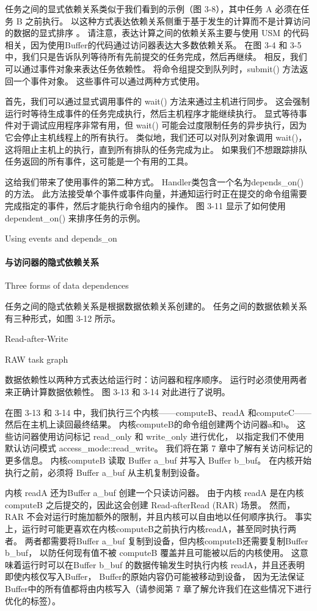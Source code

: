 任务之间的显式依赖关系类似于我们看到的示例（图 3-8），其中任务 A 必须在任务 B 之前执行。
以这种方式表达依赖关系侧重于基于发生的计算而不是计算访问的数据的显式排序 。 
请注意，表达计算之间的依赖关系主要与使用 USM 的代码相关，因为使用Buffer的代码通过访问器表达大多数依赖关系。 
在图 3-4 和 3-5 中，我们只是告诉队列等待所有先前提交的任务完成，然后再继续。 
相反，我们可以通过事件对象来表达任务依赖性。 将命令组提交到队列时，submit() 方法返回一个事件对象。 
这些事件可以通过两种方式使用。

首先，我们可以通过显式调用事件的 wait() 方法来通过主机进行同步。 
这会强制运行时等待生成事件的任务完成执行，然后主机程序才能继续执行。 
显式等待事件对于调试应用程序非常有用，但 wait() 可能会过度限制任务的异步执行，因为它会停止主机线程上的所有执行。 
类似地，我们还可以对队列对象调用 wait()，这将阻止主机上的执行，直到所有排队的任务完成为止。 
如果我们不想跟踪排队任务返回的所有事件，这可能是一个有用的工具。

这给我们带来了使用事件的第二种方式。 Handler类包含一个名为depends\_on() 的方法。 
此方法接受单个事件或事件向量，并通知运行时正在提交的命令组需要完成指定的事件，然后才能执行命令组内的操作。 
图 3-11 显示了如何使用 dependent\_on() 来排序任务的示例。

{\color{red} Using events and depends\_on}

\paragraph{与访问器的隐式依赖关系}

{\color{red} Three forms of data dependences}

任务之间的隐式依赖关系是根据数据依赖关系创建的。 任务之间的数据依赖关系有三种形式，如图 3-12 所示。

{\color{red} Read-after-Write}

{\color{red} RAW task graph}

数据依赖性以两种方式表达给运行时：访问器和程序顺序。 运行时必须使用两者来正确计算数据依赖性。 
图 3-13 和 3-14 对此进行了说明。

在图 3-13 和 3-14 中，我们执行三个内核——computeB、readA 和computeC——然后在主机上读回最终结果。 
内核computeB的命令组创建两个访问器a和b。 这些访问器使用访问标记 read\_only 和 write\_only 进行优化，
以指定我们不使用默认访问模式 access\_mode::read\_write。 我们将在第 7 章中了解有关访问标记的更多信息。
内核computeB 读取 Buffer a\_buf 并写入 Buffer b\_buf。 
在内核开始执行之前，必须将 Buffer a\_buf 从主机复制到设备。

内核 readA 还为Buffer a\_buf 创建一个只读访问器。 
由于内核 readA 是在内核computeB 之后提交的，因此这会创建 Read-afterRead (RAR) 场景。 
然而，RAR 不会对运行时施加额外的限制，并且内核可以自由地以任何顺序执行。 
事实上，运行时可能更喜欢在内核computeB之前执行内核readA，甚至同时执行两者。 
两者都需要将Buffer a\_buf 复制到设备，但内核computeB还需要复制Buffer b\_buf，
以防任何现有值不被 computeB 覆盖并且可能被以后的内核使用。 
这意味着运行时可以在Buffer b\_buf 的数据传输发生时执行内核 readA，并且还表明即使内核仅写入Buffer，
Buffer的原始内容仍可能被移动到设备，
因为无法保证 Buffer中的所有值都将由内核写入（请参阅第 7 章了解允许我们在这些情况下进行优化的标签）。

